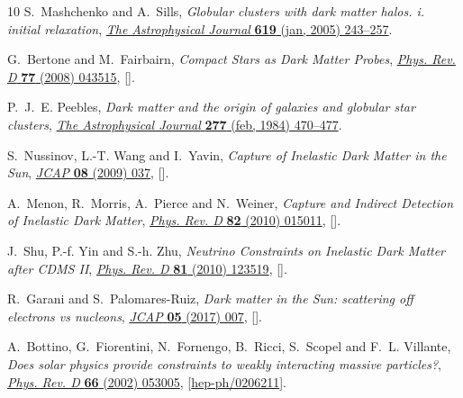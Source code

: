 \documentclass[11pt]{article}
\begin{document}
\begin{thebibliography}{10}
S.~Mashchenko and A.~Sills, \emph{Globular clusters with dark matter halos. i.
  initial relaxation}, \href{https://doi.org/10.1086/426132}{\emph{The
  Astrophysical Journal} {\bfseries 619} (jan, 2005) 243--257}.

G.~Bertone and M.~Fairbairn, \emph{{Compact Stars as Dark Matter Probes}},
  \href{https://doi.org/10.1103/PhysRevD.77.043515}{\emph{Phys. Rev. D}
  {\bfseries 77} (2008) 043515},
  [\href{https://arxiv.org/abs/0709.1485}{{}}].

P.~J.~E. Peebles, \emph{Dark matter and the origin of galaxies and globular
  star clusters}, \href{https://doi.org/10.1086/161714}{\emph{The Astrophysical
  Journal} {\bfseries 277} (feb, 1984) 470--477}.

S.~Nussinov, L.-T. Wang and I.~Yavin, \emph{{Capture of Inelastic Dark Matter
  in the Sun}},
  \href{https://doi.org/10.1088/1475-7516/2009/08/037}{\emph{JCAP} {\bfseries
  08} (2009) 037}, [\href{https://arxiv.org/abs/0905.1333}{{}}].

A.~Menon, R.~Morris, A.~Pierce and N.~Weiner, \emph{{Capture and Indirect
  Detection of Inelastic Dark Matter}},
  \href{https://doi.org/10.1103/PhysRevD.82.015011}{\emph{Phys. Rev. D}
  {\bfseries 82} (2010) 015011},
  [\href{https://arxiv.org/abs/0905.1847}{{}}].

J.~Shu, P.-f. Yin and S.-h. Zhu, \emph{{Neutrino Constraints on Inelastic Dark
  Matter after CDMS II}},
  \href{https://doi.org/10.1103/PhysRevD.81.123519}{\emph{Phys. Rev. D}
  {\bfseries 81} (2010) 123519},
  [\href{https://arxiv.org/abs/1001.1076}{{}}].

R.~Garani and S.~Palomares-Ruiz, \emph{{Dark matter in the Sun: scattering off
  electrons vs nucleons}},
  \href{https://doi.org/10.1088/1475-7516/2017/05/007}{\emph{JCAP} {\bfseries
  05} (2017) 007}, [\href{https://arxiv.org/abs/1702.02768}{{}}].

A.~Bottino, G.~Fiorentini, N.~Fornengo, B.~Ricci, S.~Scopel and F.~L. Villante,
  \emph{{Does solar physics provide constraints to weakly interacting massive
  particles?}}, \href{https://doi.org/10.1103/PhysRevD.66.053005}{\emph{Phys.
  Rev. D} {\bfseries 66} (2002) 053005},
  [\href{https://arxiv.org/abs/hep-ph/0206211}{{\ttfamily hep-ph/0206211}}].


\end{thebibliography}
\end{document}
